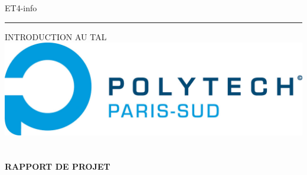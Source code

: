 \documentclass[12pt]{article}
\begin{document}
ET4-info

\rule{5cm}{0.1pt} 

INTRODUCTION AU TAL
\hfill
\includegraphics[scale=0.4]{pps.jpg} \\\\\\
\center \textbf{RAPPORT DE PROJET} \\
\end{document}
